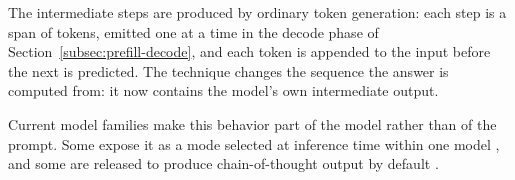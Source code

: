 The intermediate steps are produced by ordinary token generation: each step is a span of tokens, emitted one at a time in the decode phase of Section~\ref{subsec:prefill-decode}, and each token is appended to the input before the next is predicted. The technique changes the sequence the answer is computed from: it now contains the model's own intermediate output.

Current model families make this behavior part of the model rather than of the prompt. Some expose it as a mode selected at inference time within one model \cite{yangQwen3TechnicalReport2025, teamGemma4Technical2026}, and some are released to produce chain-of-thought output by default \cite{openaiGptoss120bGptoss20bModel2025}.
